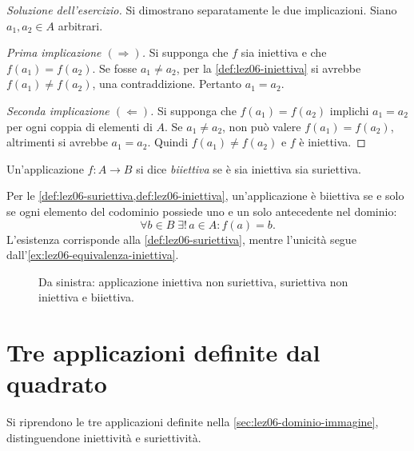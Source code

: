 \begin{proof}[Soluzione dell'esercizio]
Si dimostrano separatamente le due implicazioni.
Siano \(a_1,a_2\in A\) arbitrari.

\emph{Prima implicazione \((\Rightarrow)\).}
Si supponga che \(f\) sia iniettiva e che
\(f(a_1)=f(a_2)\). Se fosse \(a_1\ne a_2\),
per la \cref{def:lez06-iniettiva} si avrebbe
\(f(a_1)\ne f(a_2)\), una contraddizione.
Pertanto \(a_1=a_2\).

\emph{Seconda implicazione \((\Leftarrow)\).}
Si supponga che
\(f(a_1)=f(a_2)\) implichi \(a_1=a_2\)
per ogni coppia di elementi di \(A\).
Se \(a_1\ne a_2\), non può valere
\(f(a_1)=f(a_2)\), altrimenti si avrebbe
\(a_1=a_2\). Quindi \(f(a_1)\ne f(a_2)\)
e \(f\) è iniettiva.
\end{proof}

\begin{definition}[Biiettività]
\label{def:lez06-biettiva}
Un'applicazione \(f\colon A\longrightarrow B\)
si dice \emph{biiettiva} se è sia iniettiva
sia suriettiva.
\end{definition}

Per le \cref{def:lez06-suriettiva,def:lez06-iniettiva},
un'applicazione è biiettiva se e solo se
ogni elemento del codominio possiede uno
e un solo antecedente nel dominio:
\[
  \forall b\in B\;\exists!\,a\in A:
  f(a)=b.
\]
L'esistenza corrisponde alla \cref{def:lez06-suriettiva},
mentre l'unicità segue dall'\cref{ex:lez06-equivalenza-iniettiva}.

\begin{figure}[htbp]
  \centering
  
  \caption{Da sinistra: applicazione iniettiva
  non suriettiva, suriettiva non iniettiva e
  biiettiva.}
  \label{fig:lez06-proprieta}
\end{figure}

\clearpage

\section{Tre applicazioni definite dal quadrato}
\label{sec:lez06-esempi-quadrato}

Si riprendono le tre applicazioni definite nella
\cref{sec:lez06-dominio-immagine}, distinguendone
iniettività e suriettività.

